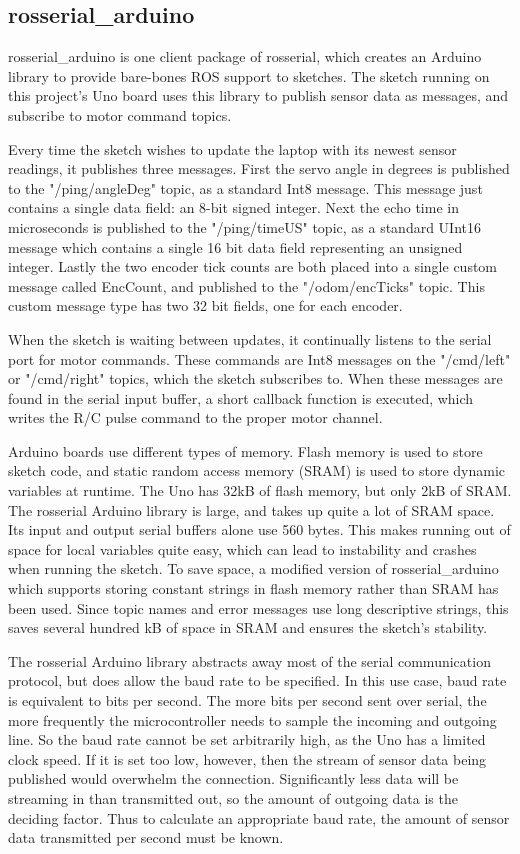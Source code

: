 \subsection{rosserial\_arduino}
rosserial\_arduino is one client package of rosserial, which creates an Arduino library to provide bare-bones ROS support to sketches. The sketch running on this project's Uno board uses this library to publish sensor data as messages, and subscribe to motor command topics.

Every time the sketch wishes to update the laptop with its newest sensor readings, it publishes three messages. First the servo angle in degrees is published to the "/ping/angleDeg" topic, as a standard Int8 message. This message just contains a single data field: an 8-bit signed integer. Next the echo time in microseconds is published to the "/ping/timeUS" topic, as a standard UInt16 message which contains a single 16 bit data field representing an unsigned integer. Lastly the two encoder tick counts are both placed into a single custom message called EncCount, and published to the "/odom/encTicks" topic. This custom message type has two 32 bit fields, one for each encoder.

When the sketch is waiting between updates, it continually listens to the serial port for motor commands. These commands are Int8 messages on the "/cmd/left" or "/cmd/right" topics, which the sketch subscribes to. When these messages are found in the serial input buffer, a short callback function is executed, which writes the R/C pulse command to the proper motor channel.

Arduino boards use different types of memory. Flash memory is used to store sketch code, and static random access memory (SRAM) is used to store dynamic variables at runtime. The Uno has 32kB of flash memory, but only 2kB of SRAM. The rosserial Arduino library is large, and takes up quite a lot of SRAM space. Its input and output serial buffers alone use 560 bytes. This makes running out of space for local variables quite easy, which can lead to instability and crashes when running the sketch. To save space, a modified version of rosserial\_arduino which supports storing constant strings in flash memory rather than SRAM has been used. Since topic names and error messages use long descriptive strings, this saves several hundred kB of space in SRAM and ensures the sketch's stability.

The rosserial Arduino library abstracts away most of the serial communication protocol, but does allow the baud rate to be specified. In this use case, baud rate is equivalent to bits per second. The more bits per second sent over serial, the more frequently the microcontroller needs to sample the incoming and outgoing line. So the baud rate cannot be set arbitrarily high, as the Uno has a limited clock speed. If it is set too low, however, then the stream of sensor data being published would overwhelm the connection. Significantly less data will be streaming in than transmitted out, so the amount of outgoing data is the deciding factor. Thus to calculate an appropriate baud rate, the amount of sensor data transmitted per second must be known.

